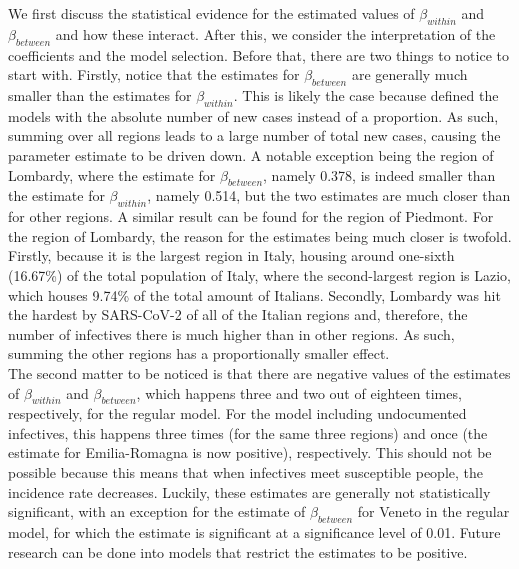 \documentclass[12pt]{article}
\begin{document}
	We first discuss the statistical evidence for the estimated values of $\beta_{within}$ and $\beta_{between}$ and how these interact. After this, we consider the interpretation of the coefficients and the model selection. Before that, there are two things to notice to start with. Firstly, notice that the estimates for $\beta_{between}$ are generally much smaller than the estimates for $\beta_{within}$. This is likely the case because \textcite{adda2016economic} defined the models with the absolute number of new cases instead of a proportion. As such, summing over all regions leads to a large number of total new cases, causing the parameter estimate to be driven down. A notable exception being the region of Lombardy, where the estimate for $\beta_{between}$, namely 0.378, is indeed smaller than the estimate for $\beta_{within}$, namely 0.514, but the two estimates are much closer than for other regions. A similar result can be found for the region of Piedmont. For the region of Lombardy, the reason for the estimates being much closer is twofold. Firstly, because it is the largest region in Italy, housing around one-sixth (16.67\%) of the total population of Italy, where the second-largest region is Lazio, which houses 9.74\% of the total amount of Italians. Secondly, Lombardy was hit the hardest by SARS-CoV-2 of all of the Italian regions and, therefore, the number of infectives there is much higher than in other regions. As such, summing the other regions has a proportionally smaller effect. \\
	
	The second matter to be noticed is that there are negative values of the estimates of $\beta_{within}$ and $\beta_{between}$, which happens three and two out of eighteen times, respectively, for the regular model. For the model including undocumented infectives, this happens three times (for the same three regions) and once (the estimate for Emilia-Romagna is now positive), respectively. This should not be possible because this means that when infectives meet susceptible people, the incidence rate decreases. Luckily, these estimates are generally not statistically significant, with an exception for the estimate of $\beta_{between}$ for Veneto in the regular model, for which the estimate is significant at a significance level of 0.01. Future research can be done into models that restrict the estimates to be positive. \\
	
\end{document}
